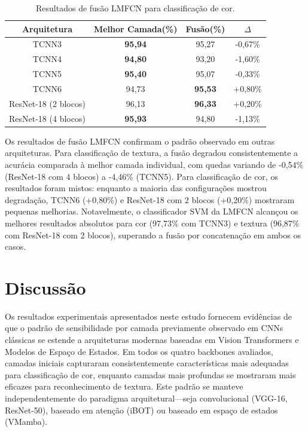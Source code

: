 \documentclass[conference]{IEEEtran}
\begin{document}
\begin{table}[htbp]
\caption{Resultados de fus\~{a}o LMFCN para classifica\c{c}\~{a}o de cor.}
\begin{center}
\begin{tabular}{|c|c|c|c|}
\hline
\textbf{Arquitetura} & \textbf{Melhor Camada(\%)} & \textbf{Fus\~{a}o(\%)} & \textbf{$\Delta$}\\
\hline
TCNN3 & \textbf{95,94} & 95,27 & -0,67\% \\
\hline
TCNN4 & \textbf{94,80} & 93,20 & -1,60\% \\
\hline
TCNN5 & \textbf{95,40} & 95,07 & -0,33\% \\
\hline
TCNN6 & 94,73 & \textbf{95,53} & +0,80\% \\
\hline
ResNet-18 (2 blocos) & 96,13 & \textbf{96,33} & +0,20\% \\
\hline
ResNet-18 (4 blocos) & \textbf{95,93} & 94,80 & -1,13\% \\
\hline
\end{tabular}
\label{tab10}
\end{center}
\end{table}

Os resultados de fus\~{a}o LMFCN confirmam o padr\~{a}o observado em outras arquiteturas. Para classifica\c{c}\~{a}o de textura, a fus\~{a}o degradou consistentemente a acur\'{a}cia comparada \`{a} melhor camada individual, com quedas variando de -0,54\% (ResNet-18 com 4 blocos) a -4,46\% (TCNN5). Para classifica\c{c}\~{a}o de cor, os resultados foram mistos: enquanto a maioria das configura\c{c}\~{o}es mostrou degrada\c{c}\~{a}o, TCNN6 (+0,80\%) e ResNet-18 com 2 blocos (+0,20\%) mostraram pequenas melhorias. Notavelmente, o classificador SVM da LMFCN alcan\c{c}ou os melhores resultados absolutos para cor (97,73\% com TCNN3) e textura (96,87\% com ResNet-18 com 2 blocos), superando a fus\~{a}o por concatena\c{c}\~{a}o em ambos os casos.


\section{Discuss\~{a}o}

Os resultados experimentais apresentados neste estudo fornecem evid\^{e}ncias de que o padr\~{a}o de sensibilidade por camada previamente observado em CNNs cl\'{a}ssicas se estende a arquiteturas modernas baseadas em Vision Transformers e Modelos de Espa\c{c}o de Estados. Em todos os quatro backbones avaliados, camadas iniciais capturaram consistentemente caracter\'{i}sticas mais adequadas para classifica\c{c}\~{a}o de cor, enquanto camadas mais profundas se mostraram mais eficazes para reconhecimento de textura. Este padr\~{a}o se manteve independentemente do paradigma arquitetural---seja convolucional (VGG-16, ResNet-50), baseado em aten\c{c}\~{a}o (iBOT) ou baseado em espa\c{c}o de estados (VMamba).
\end{document}
